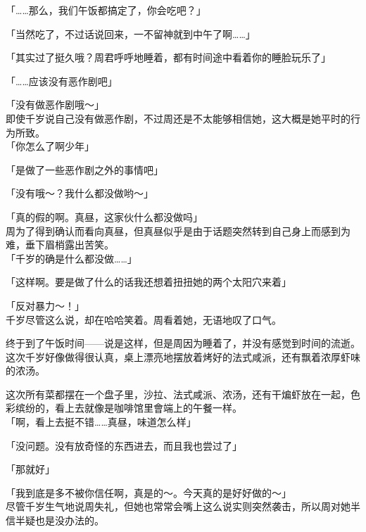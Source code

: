 「……那么，我们午饭都搞定了，你会吃吧？」

「当然吃了，不过话说回来，一不留神就到中午了啊……」

「其实过了挺久哦？周君呼呼地睡着，都有时间途中看着你的睡脸玩乐了」

「……应该没有恶作剧吧」

「没有做恶作剧哦～」\\

即使千岁说自己没有做恶作剧，不过周还是不太能够相信她，这大概是她平时的行为所致。\\

「你怎么了啊少年」

「是做了一些恶作剧之外的事情吧」

「没有哦～？我什么都没做哟～」

「真的假的啊。真昼，这家伙什么都没做吗」\\

周为了得到确认而看向真昼，但真昼似乎是由于话题突然转到自己身上而感到为难，垂下眉梢露出苦笑。\\

「千岁的确是什么都没做……」

「这样啊。要是做了什么的话我还想着扭扭她的两个太阳穴来着」

「反对暴力～！」\\

千岁尽管这么说，却在哈哈笑着。周看着她，无语地叹了口气。\\

\vspace{2\baselineskip}

终于到了午饭时间——说是这样，但是周因为睡着了，并没有感觉到时间的流逝。\\

这次千岁好像做得很认真，桌上漂亮地摆放着烤好的法式咸派，还有飘着浓厚虾味的浓汤。

这次所有菜都摆在一个盘子里，沙拉、法式咸派、浓汤，还有干煸虾放在一起，色彩缤纷的，看上去就像是咖啡馆里會端上的午餐一样。\\

「啊，看上去挺不错……真昼，味道怎么样」

「没问题。没有放奇怪的东西进去，而且我也尝过了」

「那就好」

「我到底是多不被你信任啊，真是的～。今天真的是好好做的～」\\

尽管千岁生气地说周失礼，但她也常常会嘴上这么说实则突然袭击，所以周对她半信半疑也是没办法的。

